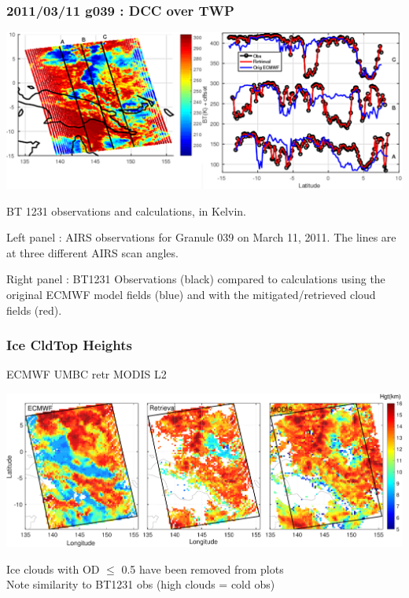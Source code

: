 \documentclass[10pt,t]{beamer}
\begin{document}
\begin{frame}
  \frametitle{2011/03/11 g039 : DCC over TWP}
  \noindent\includegraphics[width=\textwidth]{Figs/FigsRetr/AIRS_STM_Apr17/gran039_2011_03_11_bt1231_scatter_obs_3lines.pdf}

  BT 1231 \wn observations and calculations, in Kelvin.\newline

  \vspace{-0.2in} Left panel : AIRS observations for Granule 039 on March
  11, 2011. The lines are at three different AIRS scan angles. \newline

  \vspace{-0.2in} Right panel : BT1231 Observations (black) compared to
  calculations using the original ECMWF model fields (blue) and with the
  mitigated/retrieved cloud fields (red).
  
\end{frame}
\begin{frame}
  \frametitle{Ice CldTop Heights}

  \hspace{0.25in} ECMWF \hspace{1.00in} UMBC retr \hspace{1.0in} MODIS L2  \\
  \begin{center}
    \includegraphics[width=0.95\linewidth]{Figs/FigsRetr/cldheight_v2.pdf}
  \end{center}

  Ice clouds with OD $\le$ 0.5 have been removed from plots \\
  Note similarity to BT1231 obs (high clouds = cold obs)
  
\end{frame}
\end{document}
